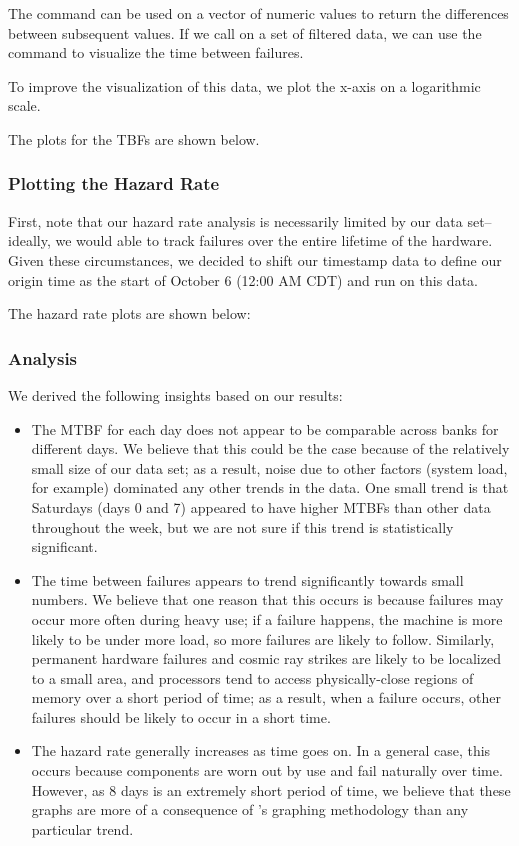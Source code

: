 The  command can be used on a vector of numeric values to return the differences between subsequent values.  If we call  on a set of filtered data, we can use the  command to visualize the time between failures.

To improve the visualization of this data, we plot the x-axis on a logarithmic scale.

The plots for the TBFs are shown below.

\subsubsection{Plotting the Hazard Rate}

First, note that our hazard rate analysis is necessarily limited by our data set--ideally, we would able to track failures over the entire lifetime of the hardware.  Given these circumstances, we decided to shift our timestamp data to define our origin time as the start of October 6 (12:00 AM CDT) and run  on this data.

The hazard rate plots are shown below:

\subsubsection{Analysis}

We derived the following insights based on our results:

\begin{itemize}
\item The MTBF for each day does not appear to be comparable across banks for different days.  We believe that this could be the case because of the relatively small size of our data set; as a result, noise due to other factors (system load, for example) dominated any other trends in the data.  One small trend is that Saturdays (days 0 and 7) appeared to have higher MTBFs than other data throughout the week, but we are not sure if this trend is statistically significant.
\item The time between failures appears to trend significantly towards small numbers.  We believe that one reason that this occurs is because failures may occur more often during heavy use; if a failure happens, the machine is more likely to be under more load, so more failures are likely to follow.  Similarly, permanent hardware failures and cosmic ray strikes are likely to be localized to a small area, and processors tend to access physically-close regions of memory over a short period of time; as a result, when a failure occurs, other failures should be likely to occur in a short time.
\item The hazard rate generally increases as time goes on.  In a general case, this occurs because components are worn out by use and fail naturally over time.  However, as 8 days is an extremely short period of time, we believe that these graphs are more of a consequence of 's graphing methodology than any particular trend. 
\end{itemize}
